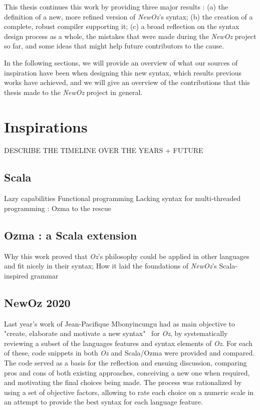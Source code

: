 This thesis continues this work by providing three major results :
(a) the definition of a new, more refined version of \textit{NewOz}'s syntax;
(b) the creation of a complete, robust compiler supporting it;
(c) a broad reflection on the syntax design process as a whole, the mistakes that were made during the \textit{NewOz} project so far, and some ideas that might help future contributors to the cause.\newline

In the following sections, we will provide an overview of what our sources of inspiration have been when designing this new syntax, which results previous works have achieved, and we will give an overview of the contributions that this thesis made to the \textit{NewOz} project in general.

\section{Inspirations}\label{sec:ch1-inspirations}

DESCRIBE THE TIMELINE OVER THE YEARS + FUTURE

\subsection{Scala}\label{subsec:ch1-scala}
Lazy capabilities\newline
Functional programming\newline
\newline
Lacking syntax for multi-threaded programming : Ozma to the rescue

\subsection{Ozma : a Scala extension}\label{subsec:ch1-ozma}
Why this work proved that \textit{Oz}'s philosophy could be applied in other languages and fit nicely in their syntax;
How it laid the foundations of \textit{NewOz}'s Scala-inspired grammar

\subsection{NewOz 2020}\label{subsec:ch1-newoz2020}
Last year's work of Jean-Pacifique Mbonyincungu had as main objective to "create, elaborate and motivate a new syntax"~\cite{jpthesis} for \textit{Oz}, by systematically reviewing a subset of the languages features and syntax elements of \textit{Oz}.
For each of these, code snippets in both \textit{Oz} and Scala/Ozma were provided and compared.
The code served as a basis for the reflection and ensuing discussion, comparing pros and cons of both existing approaches, conceiving a new one when required, and motivating the final choices being made.
The process was rationalized by using a set of objective factors, allowing to rate each choice on a numeric scale in an attempt to provide the best syntax for each language feature.\newline

